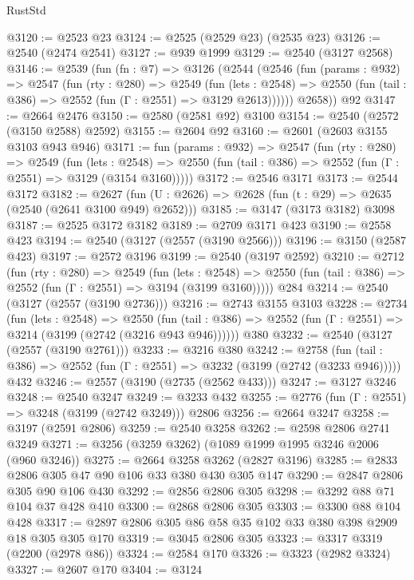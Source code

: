 \begin{lexlean}{RustStd}
\begin{coremodule}
@3120 := @2523 @23
@3124 := @2525 (@2529 @23) (@2535 @23)
@3126 := @2540 (@2474 @2541)
@3127 := @939 @1999
@3129 := @2540 (@3127 @2568)
@3146 := @2539
    (fun (fn : @7) =>
    @3126
      (@2544
        (@2546
          (fun (params : @932) =>
          @2547
            (fun (rty : @280) =>
            @2549
              (fun (lets : @2548) =>
              @2550 (fun (tail : @386) => @2552 (fun (Γ : @2551) => @3129 @2613))))))
        @2658))
    @92
@3147 := @2664 @2476
@3150 := @2580 (@2581 @92) @3100
@3154 := @2540 (@2572 (@3150 @2588) @2592)
@3155 := @2604 @92
@3160 := @2601 (@2603 @3155 @3103 @943 @946)
@3171 := fun (params : @932) =>
  @2547
    (fun (rty : @280) =>
    @2549
      (fun (lets : @2548) =>
      @2550 (fun (tail : @386) => @2552 (fun (Γ : @2551) => @3129 (@3154 @3160)))))
@3172 := @2546 @3171
@3173 := @2544 @3172
@3182 := @2627 (fun (U : @2626) => @2628 (fun (t : @29) => @2635 (@2540 (@2641 @3100 @949) @2652)))
@3185 := @3147 (@3173 @3182) @3098
@3187 := @2525 @3172 @3182
@3189 := @2709 @3171 @423
@3190 := @2558 @423
@3194 := @2540 (@3127 (@2557 (@3190 @2566)))
@3196 := @3150 (@2587 @423)
@3197 := @2572 @3196
@3199 := @2540 (@3197 @2592)
@3210 := @2712
    (fun (rty : @280) =>
    @2549
      (fun (lets : @2548) =>
      @2550 (fun (tail : @386) => @2552 (fun (Γ : @2551) => @3194 (@3199 @3160)))))
    @284
@3214 := @2540 (@3127 (@2557 (@3190 @2736)))
@3216 := @2743 @3155 @3103
@3228 := @2734
    (fun (lets : @2548) =>
    @2550 (fun (tail : @386) => @2552 (fun (Γ : @2551) => @3214 (@3199 (@2742 (@3216 @943 @946))))))
    @380
@3232 := @2540 (@3127 (@2557 (@3190 @2761)))
@3233 := @3216 @380
@3242 := @2758
    (fun (tail : @386) => @2552 (fun (Γ : @2551) => @3232 (@3199 (@2742 (@3233 @946)))))
    @432
@3246 := @2557 (@3190 (@2735 (@2562 @433)))
@3247 := @3127 @3246
@3248 := @2540 @3247
@3249 := @3233 @432
@3255 := @2776 (fun (Γ : @2551) => @3248 (@3199 (@2742 @3249))) @2806
@3256 := @2664 @3247
@3258 := @3197 (@2591 @2806)
@3259 := @2540 @3258
@3262 := @2598 @2806 @2741 @3249
@3271 := @3256 (@3259 @3262) (@1089 @1999 @1995 @3246 @2006 (@960 @3246))
@3275 := @2664 @3258 @3262 (@2827 @3196)
@3285 := @2833 @2806 @305 @47 @90 @106 @33 @380 @430 @305 @147
@3290 := @2847 @2806 @305 @90 @106 @430
@3292 := @2856 @2806 @305
@3298 := @3292 @88 @71 @104 @37 @428 @410
@3300 := @2868 @2806 @305
@3303 := @3300 @88 @104 @428
@3317 := @2897 @2806 @305 @86 @58 @35 @102 @33 @380 @398 @2909 @18 @305 @305 @170
@3319 := @3045 @2806 @305
@3323 := @3317 @3319 (@2200 (@2978 @86))
@3324 := @2584 @170
@3326 := @3323 (@2982 @3324)
@3327 := @2607 @170
@3404 := @3124

\end{coremodule}
\end{lexlean}
